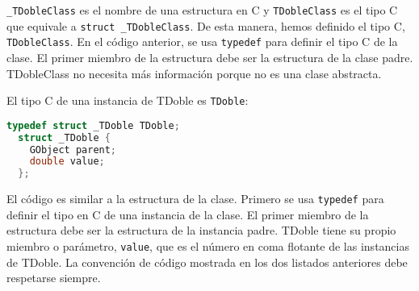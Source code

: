 \texttt{\_TDobleClass} es el nombre de una estructura en C y \texttt{TDobleClass} es el tipo C que equivale
a \texttt{struct \_TDobleClass}. De esta manera, hemos definido el tipo C, \texttt{TDobleClass}.
En el código anterior, se usa \texttt{typedef} para definir el tipo C de la clase. El primer miembro de la estructura
debe ser la estructura de la clase padre. \textsf{TDobleClass} no necesita más información porque no es una
clase abstracta.

\newpage
El tipo C de una instancia de \textsf{TDoble} es \texttt{TDoble}:
\begin{lstlisting}[language=C]
  typedef struct _TDoble TDoble;
  struct _TDoble {
    GObject parent;
    double value;
  };
\end{lstlisting}
  
El código es similar a la estructura de la clase. Primero se usa \texttt{typedef} para definir el tipo en C de una
instancia de la clase. El primer miembro de la estructura debe ser la estructura de la instancia padre.
\textsf{TDoble} tiene su propio miembro o parámetro, \texttt{value}, que es el número en coma flotante
de las instancias de \textsf{TDoble}.
La convención de código mostrada en los dos listados anteriores debe respetarse siempre.





